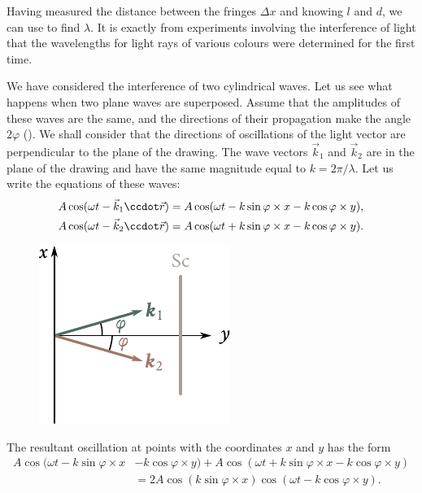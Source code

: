 Having measured the distance between the fringes $\Delta{x}$ and knowing $l$ and $d$, we can use  to find $\lambda$.
It is exactly from experiments involving the interference of light that the wavelengths for light rays of various colours were determined for the first time.

We have considered the interference of two cylindrical waves.
Let us see what happens when two plane waves are superposed.
Assume that the amplitudes of these waves are the same, and the directions of their propagation make the angle $2\varphi$ ().
We shall consider that the directions of oscillations of the light vector are perpendicular to the plane of the drawing.
The wave vectors $\vec{k}_1$ and $\vec{k}_2$ are in the plane of the drawing and have the same magnitude equal to $k=2\pi/\lambda$.
Let us write the equations of these waves:
\begin{align*}
    A \cos(\omega t - \vec{k}_1\ccdot\vec{r}) & = A \cos(\omega t - k \sin\varphi \times x - k \cos\varphi \times y),\\
    A \cos(\omega t - \vec{k}_2\ccdot\vec{r}) & = A \cos(\omega t + k \sin\varphi \times x - k \cos\varphi \times y).
\end{align*}

\begin{figure}[!htb]
	\begin{center}
		\includegraphics[scale=1]{figures/ch_17/fig_17_3.pdf}
		\caption[]{}
		\label{fig:17_3}
	\end{center}
	\vspace{-0.9cm}
\end{figure}

The resultant oscillation at points with the coordinates $x$ and $y$ has the form
\begin{align}
    A \cos(\omega t - k \sin\varphi \times x &- k \cos\varphi \times y) + A \cos(\omega t + k \sin\varphi \times x - k \cos\varphi \times y)\nonumber\\
    & = 2A \cos(k \sin\varphi \times x) \cos(\omega t - k \cos\varphi \times y). \label{eq:17_11}
\end{align}

